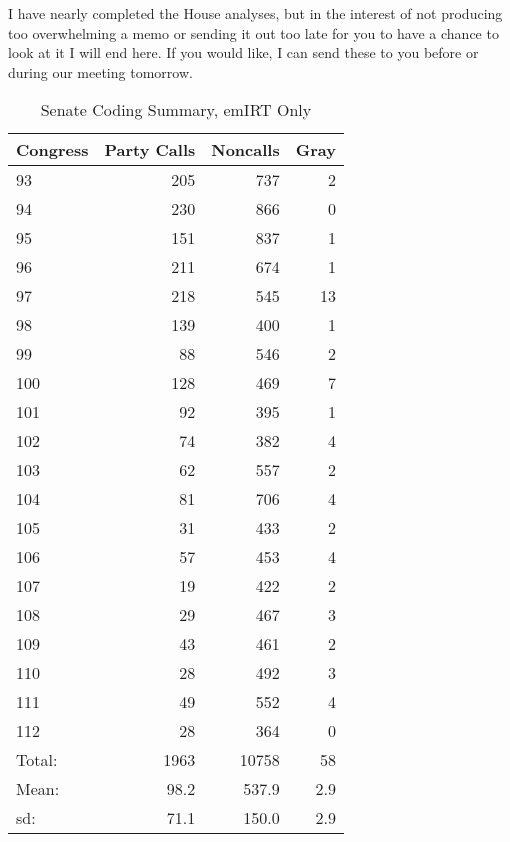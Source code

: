 \documentclass[12pt]{article}
\begin{document}
\noindent
I have nearly completed the House analyses, but in the interest of not producing too overwhelming a memo or sending it out too late for you to have a chance to look at it I will end here. If you would like, I can send these to you before or during our meeting tomorrow.

\begin{table}[ht]
	\caption{Senate Coding Summary, emIRT Only}
	\centering
	\begin{tabular}{lrrr}
		\hline
		Congress & Party Calls & Noncalls & Gray \\ 
		\hline
		93 & 205 & 737 &   2 \\ 
		94 & 230 & 866 &   0 \\ 
		95 & 151 & 837 &   1 \\ 
		96 & 211 & 674 &   1 \\ 
		97 & 218 & 545 &  13 \\ 
		98 & 139 & 400 &   1 \\ 
		99 &  88 & 546 &   2 \\ 
		100 & 128 & 469 &   7 \\ 
		101 &  92 & 395 &   1 \\ 
		102 &  74 & 382 &   4 \\ 
		103 &  62 & 557 &   2 \\ 
		104 &  81 & 706 &   4 \\ 
		105 &  31 & 433 &   2 \\ 
		106 &  57 & 453 &   4 \\ 
		107 &  19 & 422 &   2 \\ 
		108 &  29 & 467 &   3 \\ 
		109 &  43 & 461 &   2 \\ 
		110 &  28 & 492 &   3 \\ 
		111 &  49 & 552 &   4 \\ 
		112 &  28 & 364 &   0 \\ 
		\hline
		Total: & 1963 & 10758 & 58 \\
		Mean: & 98.2 & 537.9 & 2.9 \\
		sd: & 71.1 & 150.0 & 2.9 \\
		\hline
	\end{tabular}
\end{table}
\end{document}
